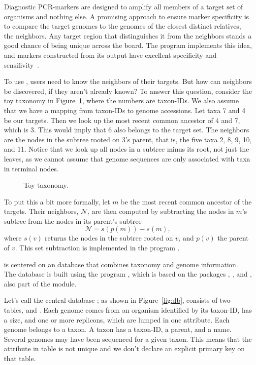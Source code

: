 Diagnostic PCR-markers are designed to amplify all members of a target
set of organisms and nothing else. A promising approach to ensure
marker specificity is to compare the target genomes to the genomes of
the closest distinct relatives, the neighbors. Any target region that
distinguishes it from the neighbors stands a good chance of being
unique across the board. The program  implements this idea,
and markers constructed from its output have excellent specificity and
sensifivity~\cite{hau21:fur}.

To use , users need to know the neighbors of their
targets. But how can neighbors be discovered, if they aren't already
known? To answer this question, consider the toy taxonomy in
Figure~\ref{fig:tax}, where the numbers are taxon-IDs. We also assume
that we have a mapping from taxon-IDs to genome accessions. Let taxa 7
and 4 be our targets. Then we look up the most recent common ancestor
of 4 and 7, which is 3. This would imply that 6 also belongs to the
target set. The neighbors are the nodes in the subtree rooted on 3's
parent, that is, the five taxa 2, 8, 9, 10, and 11. Notice that we
look up all nodes in a subtree minus its root, not just the leaves, as
we cannot assume that genome sequences are only associated with taxa
in terminal nodes.

\begin{figure}
\begin{center}

\end{center}
\caption{Toy taxonomy.}\label{fig:tax}
\end{figure}

To put this a bit more formally, let $m$ be the most recent common
ancestor of the targets. Their neighbors, $\mathcal{N}$, are then
computed by subtracting the nodes in $m$'s subtree from the nodes in
its parent's subtree
\begin{equation}\label{eq:nei}
\mathcal{N} = s(p(m)) - s(m),
\end{equation}
where $s(v)$ returns the nodes in the subtree rooted on $v$, and
$p(v)$ the parent of $v$. This set subtraction is implemented in the
program .

 is centered on an 
database that combines taxonomy and genome information. The database
is built using the program , which is based on the
packages , , and , also part of the module.

Let's call the central database ; as shown in
Figure~\ref{fig:db},  consists of two
tables,  and . Each genome comes from an organism
identified by its taxon-ID, has a size, and one or more replicons,
which are lumped in one attribute. Each genome belongs to a taxon. A
taxon has a taxon-ID, a parent, and a name. Several genomes may have
been sequenced for a given taxon. This means that the
attribute  in table  is not unique and we don't
declare an explicit primary key on that table.

